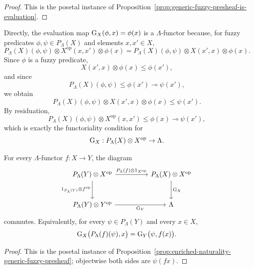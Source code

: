 \begin{proof}
    This is the posetal instance of Proposition~\ref{prop:generic-fuzzy-presheaf-is-evaluation}.
\end{proof}

\begin{remark}
\label{rem:direct-functoriality-of-evaluation}
    Directly, the evaluation map \(\operatorname{G}_X(\phi,x)=\phi(x)\) is a \(\Lambda\)-functor because, for fuzzy predicates \(\phi,\psi\in P_\Lambda(X)\) and elements \(x,x'\in X\),
    \[
        P_\Lambda(X)(\phi,\psi)
        \otimes X^{\mathrm{op}}(x,x')\otimes \phi(x)
        =
        P_\Lambda(X)(\phi,\psi)
        \otimes X(x',x)\otimes \phi(x).
    \]
    Since \(\phi\) is a fuzzy predicate,
    \[
        X(x',x)\otimes \phi(x)\leq \phi(x'),
    \]
    and since
    \[
        P_\Lambda(X)(\phi,\psi)\leq \phi(x')\multimap \psi(x'),
    \]
    we obtain
    \[
        P_\Lambda(X)(\phi,\psi)
        \otimes X(x',x)\otimes \phi(x)
        \leq
        \psi(x').
    \]
    By residuation,
    \[
        P_\Lambda(X)(\phi,\psi)
        \otimes X^{\mathrm{op}}(x,x')
        \leq
        \phi(x)\multimap\psi(x'),
    \]
    which is exactly the functoriality condition for
    \[
        \operatorname{G}_X:P_\Lambda(X)\otimes X^{\mathrm{op}}\to\Lambda.
    \]
\end{remark}

\begin{proposition}
\label{prop:naturality-generic-predicate}
    For every \(\Lambda\)-functor \(f:X\to Y\), the diagram
    \[
        \begin{tikzcd}[column sep=huge,row sep=large]
            P_\Lambda(Y)\otimes X^{\mathrm{op}}
                \arrow[r,"P_\Lambda(f)\otimes 1_{X^{\mathrm{op}}}"]
                \arrow[d,"1_{P_\Lambda(Y)}\otimes f^{\mathrm{op}}"']
            &
            P_\Lambda(X)\otimes X^{\mathrm{op}}
                \arrow[d,"\Gen_X"]
            \\
            P_\Lambda(Y)\otimes Y^{\mathrm{op}}
                \arrow[r,"\Gen_Y"']
            &
            \Lambda
        \end{tikzcd}
    \]
    commutes. Equivalently, for every \(\psi\in P_\Lambda(Y)\) and every \(x\in X\),
    \[
        \operatorname{G}_X\bigl(P_\Lambda(f)(\psi),x\bigr)
        =
        \operatorname{G}_Y\bigl(\psi,f(x)\bigr).
    \]
\end{proposition}

\begin{proof}
    This is the posetal instance of Proposition~\ref{prop:enriched-naturality-generic-fuzzy-presheaf}; objectwise both sides are \(\psi(fx)\).
\end{proof}

